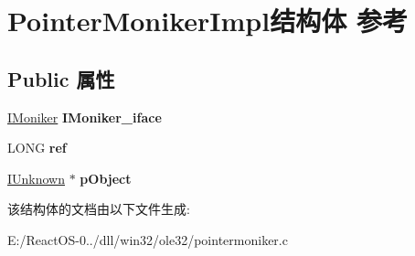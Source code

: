 \hypertarget{struct_pointer_moniker_impl}{}\section{Pointer\+Moniker\+Impl结构体 参考}
\label{struct_pointer_moniker_impl}
\subsection*{Public 属性}
\begin{DoxyCompactItemize}
\item 
\mbox{\label{struct_pointer_moniker_impl_a6c810ecff7ed14822ebd29dcdf369c9b}} 
\hyperlink{interface_i_moniker}{I\+Moniker} {\bfseries I\+Moniker\+\_\+iface}
\item 
\mbox{\label{struct_pointer_moniker_impl_ab96e3287f239bd924f7334831b3fd92c}} 
L\+O\+NG {\bfseries ref}
\item 
\mbox{\label{struct_pointer_moniker_impl_a0bd91fc81c8528f9b0184410d9f443a1}} 
\hyperlink{interface_i_unknown}{I\+Unknown} $\ast$ {\bfseries p\+Object}
\end{DoxyCompactItemize}


该结构体的文档由以下文件生成\+:\begin{DoxyCompactItemize}
\item 
E\+:/\+React\+O\+S-\/0../dll/win32/ole32/pointermoniker.\+c\end{DoxyCompactItemize}
